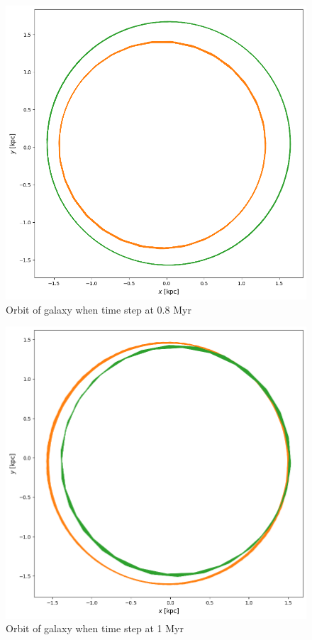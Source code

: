 \documentclass[linenumbers,RNAAS,trackchanges]{aastex631}
\begin{document}
\begin{figure}[H]
    \centering
    \includegraphics[scale=.50]{vip/0.8.png}
    \caption{Orbit of galaxy when time step at 0.8 Myr}
    \label{fig:code}
\end{figure}
\begin{figure}[H]
    \centering
    \includegraphics[scale=.50]{vip/1.png}
    \caption{Orbit of galaxy when time step at 1 Myr}
    \label{fig:code}
\end{figure}
\end{document}
